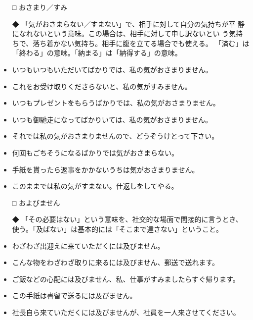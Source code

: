 \documentclass[
uplatex,
b5paper,
10pt,
dvipdfmx
]{jsbook}
\begin{document}
\begin{enumerate}
\begin{itemize}
\item[□] おさまり／すみ
\item[◆] 「気がおさまらない／すまない」で、相手に対して自分の気持ちが平
	  静になれないという意味。この場合は、相手に対して申し訳ないとい
	  う気持ちで、落ち着かない気持ち。相手に腹を立てる場合でも使える。
	  「済む」は「終わる」の意味。「納まる」は「納得する」の意味。
\end{itemize}
\begin{itemize}
\item いつもいつもいただいてばかりでは、私の気がおさまりません。
\item これをお受け取りくださらないと、私の気がすみません。
\item いつもプレゼントをもらうばかりでは、私の気がおさまりません。
\item いつも御馳走になってばかりいては、私の気がおさまりません。
\item それでは私の気がおさまりませんので、どうぞうけとって下さい。
\item 何回もごちそうになるばかりでは気がおさまらない。
\item 手紙を貰ったら返事をかかないうちは気がおさまりません。
\item このままでは私の気がすまない。仕返しをしてやる。
\end{itemize}

\begin{itemize}
\item[□] およびません
\item[◆] 「その必要はない」という意味を、社交的な場面で間接的に言うとき、
	  使う。「及ばない」は基本的には「そこまで達さない」ということ。
\end{itemize}
\begin{itemize}
\item わざわざ出迎えに来ていただくには及びません。
\item こんな物をわざわざ取りに来るには及びません、郵送で送れます。
\item ご飯などの心配には及びません、私、仕事がすみましたらすぐ帰ります。
\item この手紙は書留で送るには及びません。
\item 社長自ら来ていただくには及びませんが、社員を一人来させてください。
\end{itemize}


\end{enumerate}
\end{document}
